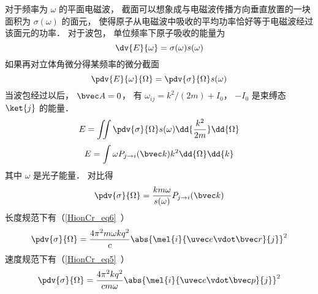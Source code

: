 
\begin{issues}
\issueDraft
\end{issues}


对于频率为 $\omega$ 的平面电磁波， 截面可以想象成与电磁波传播方向垂直放置的一块面积为 $\sigma(\omega)$ 的面元， 使得原子从电磁波中吸收的平均功率恰好等于电磁波经过该面元的功率． 对于波包， 单位频率下原子吸收的能量为
\begin{equation}
\dv{E}{\omega} = \sigma(\omega) s(\omega)
\end{equation}
如果再对立体角微分得某频率的微分截面 %
\begin{equation}
\pdv{E}{\omega}{\Omega} = \pdv{\sigma}{\Omega} s(\omega)
\end{equation}
当波包经过以后， $\bvec A = 0$， 有 $\omega_{ij} = k^2/(2m) + I_0$， $-I_0$ 是束缚态 $\ket{j}$ 的能量．
\begin{equation}
E = \iint \pdv{\sigma}{\Omega} s(\omega) \dd{\frac{k^2}{2m}}\dd{\Omega}
\end{equation}
\begin{equation}
E = \int \omega P_{j\to i}(\bvec k) k^2\dd{\Omega}\dd{k}
\end{equation}
其中 $\omega$ 是光子能量． 对比得
\begin{equation}
\pdv{\sigma}{\Omega} = \frac{km \omega}{s(\omega)} P_{j\to i}(\bvec k)
\end{equation}
长度规范下有（\autoref{HionCr_eq6}~）
\begin{equation}
\pdv{\sigma}{\Omega} = \frac{4\pi^2 m\omega k q^2}{c} \abs{\mel{i}{\uvec e \vdot\bvec r}{j}}^2
\end{equation}
速度规范下有（\autoref{HionCr_eq5}~）
\begin{equation}\label{SIcros_eq8} %
\pdv{\sigma}{\Omega} = \frac{4\pi^2 k q^2}{c m \omega} \abs{\mel{i}{\uvec e \vdot \bvec p}{j}}^2
\end{equation}
